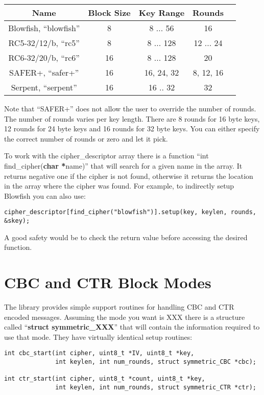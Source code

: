 \documentclass{book}
\begin{document}
\begin{center}
\begin{tabular}{|c|c|c|c|c|}
     \hline Name & Block Size & Key Range & Rounds \\
     \hline Blowfish, ``blowfish'' & 8 & 8 ... 56 & 16 \\
     \hline RC5-32/12/b, ``rc5'' & 8 & 8 ... 128 & 12 ... 24 \\
     \hline RC6-32/20/b, ``rc6'' & 16 & 8 ... 128 & 20 \\
     \hline SAFER+, ``safer+'' & 16 & 16, 24, 32 & 8, 12, 16 \\
     \hline Serpent, ``serpent'' & 16 & 16 .. 32 & 32 \\
     \hline
\end{tabular}
\end{center}

Note that ``SAFER+'' does not allow the user to override the number of rounds.  The number of rounds varies per 
key length.  There are 8 rounds for 16 byte keys, 12 rounds for 24 byte keys and 16 rounds for 32 byte keys.  You can either
specify the correct number of rounds or zero and let it pick.

To work with the cipher\_descriptor array there is a function ``int find\_cipher({\bf char *}name)'' that will search
for a given name in the array.  It returns negative one if the cipher is not found, otherwise it returns the location
in the array where the cipher was found.  For example, to indirectly setup Blowfish you can also use:

\begin{small}
\begin{verbatim}
cipher_descriptor[find_cipher("blowfish")].setup(key, keylen, rounds, &skey);
\end{verbatim}
\end{small}

A good safety would be to check the return value before accessing the desired function.

\section{CBC and CTR Block Modes}
The library provides simple support routines for handling CBC and CTR encoded messages.  Assuming the mode you want
is XXX there is a structure called ``{\bf struct symmetric\_XXX}'' that will contain the information required to
use that mode.  They have virtually identical setup routines:
\begin{verbatim}
int cbc_start(int cipher, uint8_t *IV, uint8_t *key, 
              int keylen, int num_rounds, struct symmetric_CBC *cbc);

int ctr_start(int cipher, uint8_t *count, uint8_t *key, 
              int keylen, int num_rounds, struct symmetric_CTR *ctr);
\end{verbatim}
\end{document}
